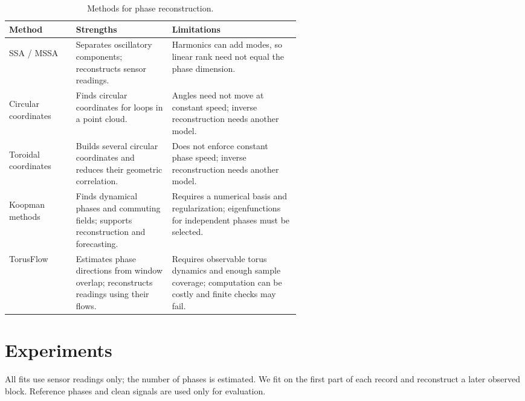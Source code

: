 \documentclass[11pt,a4paper]{article}
\begin{document}
\begin{table}[H]
\centering
\caption{Methods for phase reconstruction.}
\label{tab:method-comparison}
\begingroup
\normalsize
\setlength{\tabcolsep}{6pt}
\setlength{\parskip}{0pt}
\renewcommand{\arraystretch}{1.15}
\begin{tabular}{@{}
  >{\raggedright\arraybackslash}p{0.23\linewidth}
  >{\raggedright\arraybackslash}p{0.33\linewidth}
  >{\raggedright\arraybackslash}p{}
  @{}}
\toprule
\textbf{Method} & \textbf{Strengths} & \textbf{Limitations} \\
\midrule
SSA / MSSA\par
\citep{BroomheadKing1986,GrothGhil2011}
& Separates oscillatory components; reconstructs sensor readings.
& Harmonics can add modes, so linear rank need not equal the phase dimension. \\
\addlinespace[8pt]
Circular coordinates\par
\citep{deSilva2011}
& Finds circular coordinates for loops in a point cloud.
& Angles need not move at constant speed; inverse reconstruction needs
another model. \\
\addlinespace[8pt]
Toroidal coordinates\par
\citep{Scoccola2023}
& Builds several circular coordinates and reduces their geometric correlation.
& Does not enforce constant phase speed; inverse reconstruction needs
another model. \\
\addlinespace[8pt]
Koopman methods\par
\citep{Giannakis2019}
& Finds dynamical phases and commuting fields; supports reconstruction
and forecasting.
& Requires a numerical basis and regularization; eigenfunctions for
independent phases must be selected. \\
\addlinespace[8pt]
TorusFlow
& Estimates phase directions from window overlap; reconstructs readings
using their flows.
& Requires observable torus dynamics and enough sample coverage;
computation can be costly and finite checks may fail. \\
\bottomrule
\end{tabular}
\endgroup
\end{table}

\section*{Experiments}
All fits use sensor readings only; the number of phases is estimated.
We fit on the first part of each record and reconstruct a later observed
block. Reference phases and clean signals are used only for evaluation.
\end{document}
